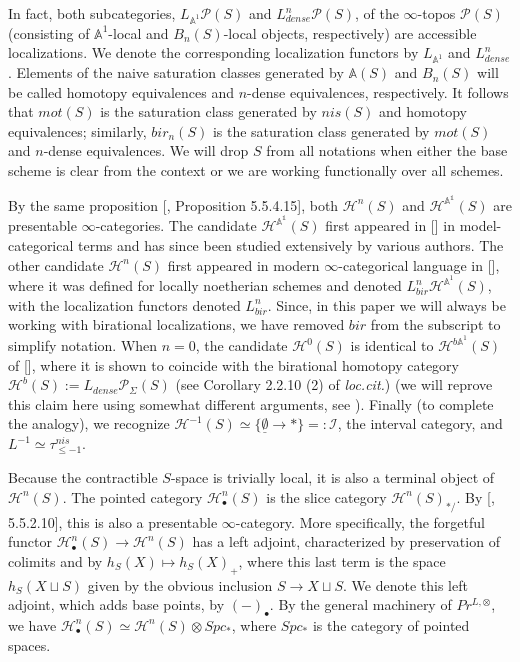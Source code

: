 In fact, both subcategories, $L_{\mathbb{A}^1}\mathcal{P}(S)$ and $L_{dense}^n\mathcal{P}(S)$, of the $\infty$-topos $\mathcal{P}(S)$ (consisting of $\mathbb{A}^1$-local and $B_n(S)$-local objects, respectively) are accessible localizations. We denote the corresponding localization functors by $L_{\mathbb{A}^1}$ and $L_{dense}^n$. Elements of the naive saturation classes generated by $\mathbb{A}(S)$ and $B_n(S)$ will be called homotopy equivalences and $n$-dense equivalences, respectively. It follows that $mot(S)$ is the saturation class generated by $nis(S)$ and homotopy equivalences; similarly, $bir_n(S)$ is the saturation class generated by $mot(S)$ and $n$-dense equivalences. We will drop $S$ from all notations when either the base scheme is clear from the context or we are working functionally over all schemes. 


By the same proposition [\cite{lurie2009higher}, Proposition 5.5.4.15], both $\mathcal{H}^{n}(S)$ and $ \mathcal{H}^{\mathbb{A^1}}(S)$ are presentable $\infty$-categories. The candidate $\mathcal{H}^{\mathbb{A^1}}(S)$ first appeared in [\cite{morel19991}] in model-categorical terms and has since been studied extensively by various authors. The other candidate $\mathcal{H}^n(S)$ first appeared in modern $\infty$-categorical language in [\cite{bachmann2019voevodsky}], where it was defined for locally noetherian schemes and denoted $L^n_{bir}\mathcal{H}^{\mathbb{A}^1}(S)$, with the localization functors denoted $L^n_{bir}$. Since, in this paper we will always be working with birational localizations, we have removed $bir$ from the subscript to simplify notation. When $n=0$, the candidate $\mathcal{H}^0(S)$ is identical to $\mathcal{H}^{b\mathbb{A}^1}(S)$ of [\cite{0bat}], where it is shown to coincide with the birational homotopy category $\mathcal{H}^b(S):=L_{dense}\mathcal{P}_\Sigma(S)$ (see Corollary 2.2.10 (2) of \textit{loc.cit.}) (we will reprove this claim here using somewhat different arguments, see ). Finally (to complete the analogy), we recognize $\mathcal{H}^{{-1}}(S)\simeq \{\underline{\emptyset}\to*\}=:\mathcal{I}$, the interval category, and $L^{-1}\simeq  \tau_{\leq -1}^{nis}$.

Because the contractible $S$-space is trivially local, it is also a terminal object of $\mathcal{H}^n(S)$. The pointed category $\mathcal{H}_\bullet ^n(S)$ is the slice category $\mathcal{H}^n(S)_{*/}$. By [\cite{lurie2009higher}, 5.5.2.10], this is also a presentable $\infty$-category. More specifically, the forgetful functor $\mathcal{H}_\bullet^n(S)\to \mathcal{H}^n(S)$ has a left adjoint, characterized by preservation of colimits and by $h_S(X)\mapsto h_S(X)_+$, where this last term is the space $h_S(X\sqcup S)$ given by the obvious inclusion $S\to X\sqcup S$. We denote this left adjoint, which adds base points, by $(-)_\bullet$. By the general machinery of $Pr^{L,\otimes }$, we have $\mathcal{H}^n_\bullet(S)\simeq \mathcal{H}^n(S)\otimes Spc_*$, where $Spc_*$ is the category of pointed spaces.


